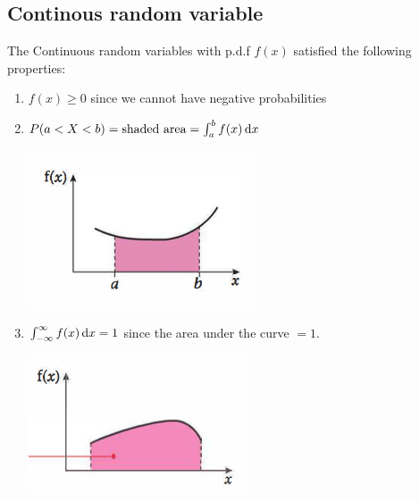 \documentclass[a4paper]{article}
\begin{document}
\subsection{Continous random variable}
The Continuous random variables with p.d.f $f(x)$ satisfied the following properties:
\begin{enumerate}
	\item $f(x)\geq 0$ since we cannot have negative probabilities
	\item $P(a<X<b)= \text{shaded area} = \int_a^b f(x) \, \mathrm{d} x$
	      \begin{center}
		      \includegraphics[scale=0.5]{img_S/11_1_intro1}
	      \end{center}
	\item  $\int_{-\infty}^{\infty}f(x)\, \mathrm{d} x=1$ since the area under the curve $=1$.
	      \begin{center}
		      \includegraphics[scale=0.5]{img_S/11_1_intro2}
	      \end{center}
\end{enumerate}
\end{document}
